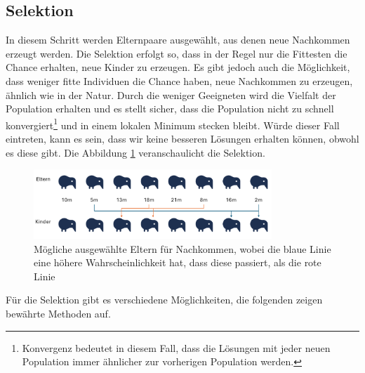 %
%
%
%
\subsection{Selektion
\label{buch:paper:varalg:subsection:selection}}
In diesem Schritt werden Elternpaare ausgewählt, aus denen neue 
Nachkommen erzeugt werden. Die Selektion erfolgt so, dass in der 
Regel nur die Fittesten die Chance erhalten, neue Kinder zu erzeugen. 
Es gibt jedoch auch die Möglichkeit, dass weniger fitte Individuen die 
Chance haben, neue Nachkommen zu erzeugen, ähnlich wie in der Natur.
Durch die weniger Geeigneten wird die Vielfalt der Population erhalten
und es stellt sicher, dass die Population nicht zu schnell 
konvergiert\footnote{
    Konvergenz bedeutet in diesem Fall, dass die Lösungen mit jeder neuen 
    Population immer ähnlicher zur vorherigen Population werden.
    }
und in einem lokalen Minimum stecken bleibt. Würde dieser Fall eintreten, 
kann es sein, dass wir keine besseren Lösungen erhalten können, obwohl es 
diese gibt. Die Abbildung
\ref{fig:selection_of_parents} veranschaulicht die Selektion.
\begin{figure}
    \centering
    \includegraphics[width=0.8\textwidth]{
        papers/varalg/images/teil3/04OffspringProbability.png
    }
    \caption{
        Mögliche ausgewählte Eltern für Nachkommen, wobei die blaue Linie 
        eine höhere Wahrscheinlichkeit hat, dass diese passiert, als die rote Linie}
    \label{fig:selection_of_parents}
\end{figure}
Für die Selektion gibt es verschiedene Möglichkeiten, die folgenden zeigen bewährte
Methoden auf.
